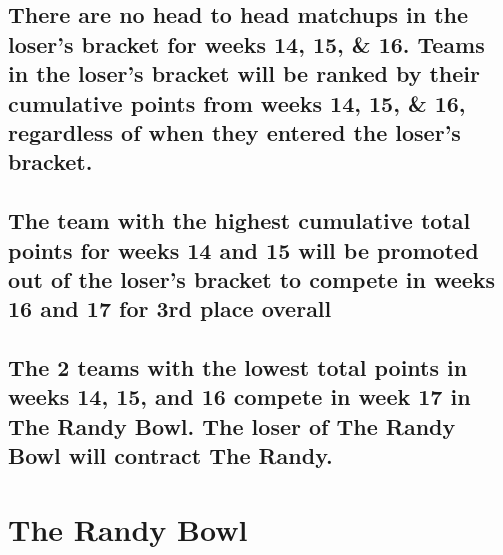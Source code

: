 \documentclass[
]{book}
\begin{document}
\hypertarget{there-are-no-head-to-head-matchups-in-the-losers-bracket-for-weeks-14-15-16.-teams-in-the-losers-bracket-will-be-ranked-by-their-cumulative-points-from-weeks-14-15-16-regardless-of-when-they-entered-the-losers-bracket.}{%
\subsection{There are no head to head matchups in the loser's bracket for weeks 14, 15, \& 16. Teams in the loser's bracket will be ranked by their cumulative points from weeks 14, 15, \& 16, regardless of when they entered the loser's bracket.}\label{there-are-no-head-to-head-matchups-in-the-losers-bracket-for-weeks-14-15-16.-teams-in-the-losers-bracket-will-be-ranked-by-their-cumulative-points-from-weeks-14-15-16-regardless-of-when-they-entered-the-losers-bracket.}}

\hypertarget{the-team-with-the-highest-cumulative-total-points-for-weeks-14-and-15-will-be-promoted-out-of-the-losers-bracket-to-compete-in-weeks-16-and-17-for-3rd-place-overall}{%
\subsection{The team with the highest cumulative total points for weeks 14 and 15 will be promoted out of the loser's bracket to compete in weeks 16 and 17 for 3rd place overall}\label{the-team-with-the-highest-cumulative-total-points-for-weeks-14-and-15-will-be-promoted-out-of-the-losers-bracket-to-compete-in-weeks-16-and-17-for-3rd-place-overall}}

\hypertarget{the-2-teams-with-the-lowest-total-points-in-weeks-14-15-and-16-compete-in-week-17-in-the-randy-bowl.-the-loser-of-the-randy-bowl-will-contract-the-randy.}{%
\subsection{The 2 teams with the lowest total points in weeks 14, 15, and 16 compete in week 17 in The Randy Bowl. The loser of The Randy Bowl will contract The Randy.}\label{the-2-teams-with-the-lowest-total-points-in-weeks-14-15-and-16-compete-in-week-17-in-the-randy-bowl.-the-loser-of-the-randy-bowl-will-contract-the-randy.}}

\hypertarget{the-randy-bowl}{%
\section{The Randy Bowl}\label{the-randy-bowl}}
\end{document}
